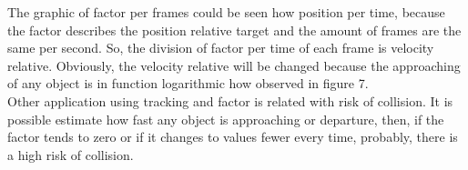 The graphic of factor per frames could be seen how position per time, because the factor describes the position relative target and the amount of 
frames are the same per second. So, the division of factor per time of each frame is velocity relative. Obviously, the velocity relative will be 
changed because the approaching of any object is in function logarithmic how observed in figure 7.\\
Other application using tracking and factor is related with risk of collision. It is possible estimate how fast any object is approaching 
or departure, then, if the factor tends to zero or if it changes to values fewer every time, probably, there is a high risk of collision.


